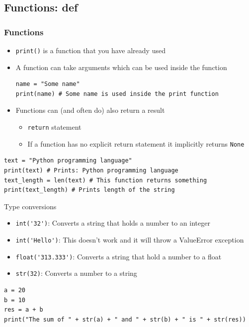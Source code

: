 \documentclass[10pt, a4paper]{beamer} %
\begin{document}
\subsection{Functions: def} %
\label{sub:functions}
\begin{frame}\frametitle{Functions}
\begin{itemize}
    \item \lstinline!print()! is a function that you have already used
    \item A function can take arguments which can be used inside the function
    \begin{lstlisting}
name = "Some name"
print(name) # Some name is used inside the print function
    \end{lstlisting}
    \item Functions can (and often do) also return a result
    \begin{itemize}
        \item \lstinline!return! statement
        \item If a function has no explicit return statement it implicitly returns \lstinline!None!
    \end{itemize}
\end{itemize}

\begin{examples}
    \begin{lstlisting}
text = "Python programming language"
print(text) # Prints: Python programming language
text_length = len(text) # This function returns something
print(text_length) # Prints length of the string
    \end{lstlisting}
\end{examples}
\framebreak
\begin{block}{Type conversions}
\begin{itemize}
    \item \lstinline!int('32')!: Converts a string that holds a number to an integer
    \item \lstinline!int('Hello')!: This doesn't work and it will throw a ValueError exception
    \item \lstinline!float('313.333')!: Converts a string that hold a number to a float
    \item \lstinline!str(32)!: Converts a number to a string
\end{itemize}

\begin{examples}
\begin{lstlisting}
a = 20
b = 10
res = a + b
print("The sum of " + str(a) + " and " + str(b) + " is " + str(res))
\end{lstlisting}
\end{examples}
\end{block}


\end{frame}
\end{document}
